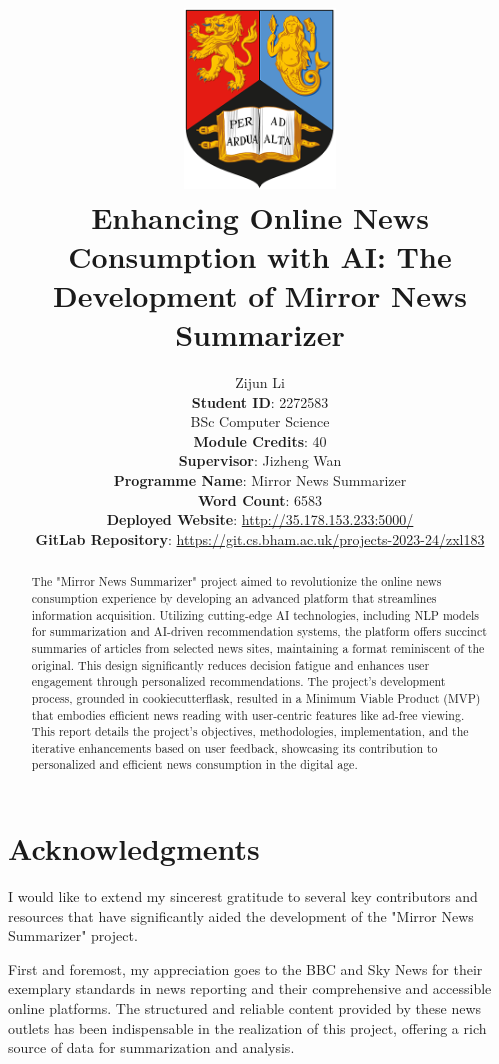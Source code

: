 \documentclass[10pt]{article}
\title{\includegraphics[width=0.3\textwidth]{../BirmCrest.png}\\
        \Huge{\textbf{Enhancing Online News Consumption with AI: The Development of Mirror News Summarizer}}
}
\author{{Zijun Li}\\[10pt]
        {\textbf{Student ID}: 2272583}\\[10pt]
        {BSc Computer Science}\\[10pt]
        {\textbf{Module Credits}: 40}\\[20pt]
        {\textbf{Supervisor}: Jizheng Wan}\\[10pt]
        {\textbf{Programme Name}: Mirror News Summarizer}\\[10pt]
        {\textbf{Word Count}: 6583}\\[20pt]
        {\textbf{Deployed Website}: \href{http://35.178.153.233:5000/}{http://35.178.153.233:5000/}}\\[10pt]
        {\textbf{GitLab Repository}: \href{https://git.cs.bham.ac.uk/projects-2023-24/zxl183}{https://git.cs.bham.ac.uk/projects-2023-24/zxl183}}\\[10pt]
}
\begin{document}
\begin{titlingpage} %
    \setlength{\droptitle}{1em}    %
    \maketitle
    \thispagestyle{empty}
\end{titlingpage}

\newpage

\begin{center}
	\tableofcontents
\end{center}

\newpage

\begin{abstract}
    The "Mirror News Summarizer" project aimed to revolutionize the online news consumption experience by developing an advanced platform that streamlines information acquisition. Utilizing cutting-edge AI technologies, including NLP models for summarization and AI-driven recommendation systems, the platform offers succinct summaries of articles from selected news sites, maintaining a format reminiscent of the original. This design significantly reduces decision fatigue and enhances user engagement through personalized recommendations. The project's development process, grounded in cookiecutterflask, resulted in a Minimum Viable Product (MVP) that embodies efficient news reading with user-centric features like ad-free viewing. This report details the project's objectives, methodologies, implementation, and the iterative enhancements based on user feedback, showcasing its contribution to personalized and efficient news consumption in the digital age.
\end{abstract}

\section*{Acknowledgments}
\thispagestyle{empty} %

I would like to extend my sincerest gratitude to several key contributors and resources that have significantly aided the development of the "Mirror News Summarizer" project.

First and foremost, my appreciation goes to the BBC and Sky News for their exemplary standards in news reporting and their comprehensive and accessible online platforms. The structured and reliable content provided by these news outlets has been indispensable in the realization of this project, offering a rich source of data for summarization and analysis.
\end{document}
